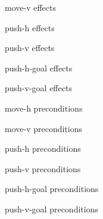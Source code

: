 \documentclass[../Master.tex]{subfiles}
\providecommand{\master}{..}
\begin{document}
\begin{figure}
    \centering
    
    \caption{move-v effects}
\end{figure}

\begin{figure}
    \centering
    
    \caption{push-h effects}
\end{figure}

\begin{figure}
    \centering
    
    \caption{push-v effects}
\end{figure}

\begin{figure}
    \centering
    
    \caption{push-h-goal effects}
\end{figure}

\begin{figure}
    \centering
    
    \caption{push-v-goal effects}
\end{figure}

\begin{figure}
    \centering
    
    \caption{move-h preconditions}
\end{figure}

\begin{figure}
    \centering
    
    \caption{move-v preconditions}
\end{figure}

\begin{figure}
    \centering
    
    \caption{push-h preconditions}
\end{figure}

\begin{figure}
    \centering
    
    \caption{push-v preconditions}
\end{figure}

\begin{figure}
    \centering
    
    \caption{push-h-goal preconditions}
\end{figure}

\begin{figure}
    \centering
    
    \caption{push-v-goal preconditions}
\end{figure}
\end{document}

